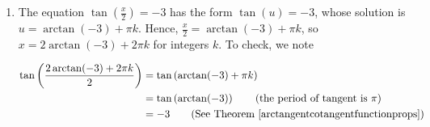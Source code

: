 {\begin{enumerate}
\[ \begin{array}{rclr}

\sec^{2}\left(\frac{\pi}{3} + \pi k\right)  &  = &  \left( \pm \sec\left(\frac{\pi}{3}\right)\right)^2  & \\ [3pt]
																												& =  &   (\pm 2)^2 &  \\ [3pt]
																												& =  & 4 & \\
																								
\end{array}\] 

\drawexampleline

The same holds for the family $x =\frac{2\pi}{3} + \pi k$.  The solutions which lie in $[0,2\pi)$ come from the values $k = 0$ and $k=1$, namely $x = \frac{\pi}{3}$, $\frac{2\pi}{3}$, $\frac{4\pi}{3}$ and $\frac{5\pi}{3}$.  To confirm graphically, we simply plot $f(x)=\sec^2(x)$ in GeoGebra: see Figure \ref{fig:trigeg1-4}. (Again, if you're using a calculator, you'll probably have to rely on a reciprocal identity.) The $x$-coordinates of the intersection points of  $y = \frac{1}{(\cos(x))^2}$ and $y = 4$ verify our answers.


\item  The equation  $\tan\left(\frac{x}{2}\right) = -3$ has the form $\tan(u) = -3$, whose solution is $u = \arctan(-3) + \pi k$.  Hence, $\frac{x}{2} = \arctan(-3) + \pi k$, so  $x = 2\arctan(-3) + 2\pi k$ for integers $k$.  To check, we note

\begin{align*}
\tan\left(\frac{2\arctan(-3) + 2\pi k}{2}\right)  &  =  \tan\left( \arctan(-3) + \pi k \right)\\													& =   \tan\left(\arctan(-3) \right)  \tag*{(the period of tangent is $\pi$)} \\																		& =   -3  \tag*{(See Theorem \ref{arctangentcotangentfunctionprops})}
\end{align*}



\end{enumerate}}
